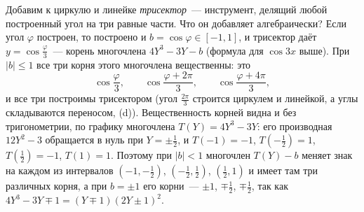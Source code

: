 \begin{aside}
Добавим к циркулю и линейке \emph{трисектор}~--- инструмент, делящий любой построенный угол на три равные части. Что
он добавляет алгебраически? Если угол $\varphi$ построен, то построено и $b=\cos\varphi\in[-1,1]$, и трисектор даёт
$y=\cos\frac\varphi3$~--- корень многочлена $4Y^3-3Y-b$ (формула для $\cos3x$ выше). При $|b|\le1$ все три корня этого
многочлена вещественны: это
\[
\cos\frac\varphi3,\qquad \cos\frac{\varphi+2\pi}3,\qquad \cos\frac{\varphi+4\pi}3 ,
\]
и все три построимы трисектором (угол $\frac{2\pi}3$ строится циркулем и линейкой, а углы складываются переносом,
(d)). Вещественность корней видна и без тригонометрии, по графику многочлена $T(Y)=4Y^3-3Y$: его производная
$12Y^2-3$ обращается в нуль при $Y=\pm\frac12$, и $T(-1)=-1$, $T(-\frac12)=1$, $T(\frac12)=-1$, $T(1)=1$. Поэтому при
$|b|<1$ многочлен $T(Y)-b$ меняет знак на каждом из интервалов $(-1,-\frac12)$, $(-\frac12,\frac12)$, $(\frac12,1)$ и
имеет там три различных корня, а при $b=\pm1$ его корни~--- $\pm1$, $\mp\frac12$, $\mp\frac12$, так как
$4Y^3-3Y\mp1=(Y\mp1)(2Y\pm1)^2$.

\begin{center}
\begin{keepfig}
\centering
{}
\end{keepfig}
\end{center}


\end{aside}
